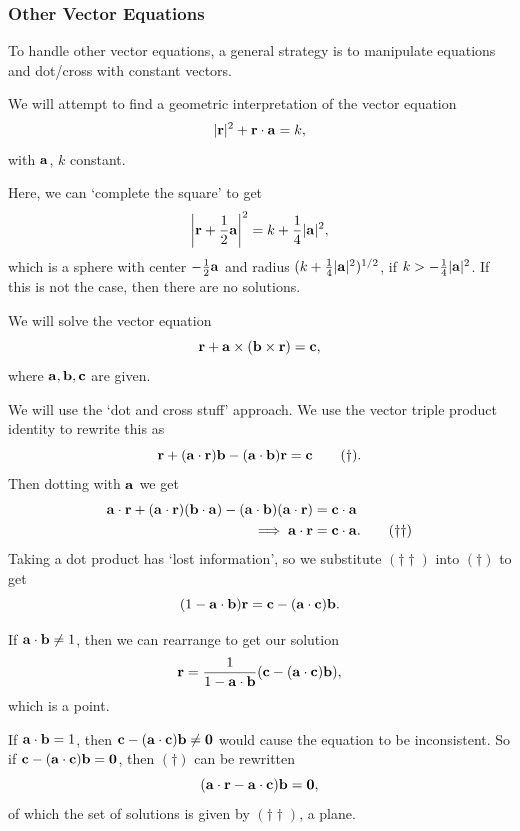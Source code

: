 \documentclass[a4paper]{scrartcl}
\begin{document}
\subsubsection{Other Vector Equations}

To handle other vector equations, a general strategy is to manipulate equations and dot/cross with constant vectors.

\begin{example}
    We will attempt to find a geometric interpretation of the vector equation
    $$
    |\mathbf{r}|^2 + \mathbf{r} \cdot \mathbf{a} = k,
    $$
    with $\mathbf{a}$, $k$ constant.

    Here, we can `complete the square' to get
    $$
    \left|\mathbf{r} + \frac{1}{2}\mathbf{a}\right|^2 = k + \frac{1}{4}|\mathbf{a}|^2,
    $$
    which is a sphere with center $-\frac{1}{2}\mathbf{a}$ and radius $(k + \frac{1}{4}|\mathbf{a}|^2)^{1/2}$, if $k > - \frac{1}{4}|\mathbf{a}|^2$. If this is not the case, then there are no solutions.
\end{example}

\begin{example}
    We will solve the vector equation
    $$
    \mathbf{r} + \mathbf{a} \times (\mathbf{b} \times \mathbf{r}) = \mathbf{c},
    $$
    where $\mathbf{a}, \mathbf{b}, \mathbf{c}$ are given.

    We will use the `dot and cross stuff' approach. We use the vector triple product identity to rewrite this as
    \begin{equation}
        \mathbf{r} + (\mathbf{a} \cdot \mathbf{r}) \mathbf{b} - (\mathbf{a} \cdot \mathbf{b})\mathbf{r} = \mathbf{c} \tag{$\dagger$}.
    \end{equation}
    Then dotting with $\mathbf{a}$ we get
    \begin{align*}
        \mathbf{a} \cdot \mathbf{r} + (\mathbf{a} \cdot \mathbf{r})(\mathbf{b} \cdot \mathbf{a}) - (\mathbf{a} \cdot \mathbf{b})(\mathbf{a} \cdot \mathbf{r}) &= \mathbf{c} \cdot \mathbf{a} \nonumber \\
\implies \mathbf{a} \cdot \mathbf{r} &= \mathbf{c} \cdot \mathbf{a}. \tag{$\dagger \dagger$}
    \end{align*}
    Taking a dot product has `lost information', so we substitute $(\dagger \dagger)$ into $(\dagger)$ to get
    $$
    (1 - \mathbf{a} \cdot \mathbf{b}) \mathbf{r} = \mathbf{c} - (\mathbf{a} \cdot \mathbf{c}) \mathbf{b}.
    $$

    If $\mathbf{a} \cdot \mathbf{b} \neq 1$, then we can rearrange to get our solution
    $$
        \mathbf{r} = \frac{1}{1 - \mathbf{a} \cdot \mathbf{b}} ( \mathbf{c} - (\mathbf{a} \cdot \mathbf{c}) \mathbf{b}),
    $$
    which is a point.

    If $\mathbf{a} \cdot \mathbf{b} = 1$, then $\mathbf{c} - (\mathbf{a} \cdot \mathbf{c})\mathbf{b} \neq \mathbf{0}$ would cause the equation to be inconsistent. So if $\mathbf{c} - (\mathbf{a} \cdot \mathbf{c})\mathbf{b} = \mathbf{0}$, then $(\dagger)$ can be rewritten
    $$
    (\mathbf{a} \cdot \mathbf{r} - \mathbf{a} \cdot \mathbf{c}) \mathbf{b} = \mathbf{0},
    $$
    of which the set of solutions is given by $(\dagger \dagger)$, a plane.
\end{example}
\end{document}
